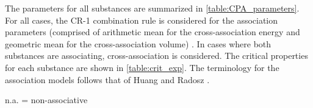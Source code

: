 \documentclass[preprint,12pt,3p]{elsarticle}
\begin{document}
	The parameters for all substances are summarized in \cref{table:CPA_parameters}. For all cases, the \mbox{CR-1} combination rule is considered for the association parameters (comprised of arithmetic mean for the cross-association energy and geometric mean for the cross-association volume)  . In cases where both substances are associating, cross-association is considered. The critical properties for each substance are shown in \cref{table:crit_exp}. The terminology for the association models follows that of Huang and Radosz \cite{huang1990equation}.

\begin{table}[h!]
\centering
\caption{Parameters of the CPA equation of state used in this work.}
\label{table:CPA_parameters}
\raggedright n.a. = non-associative
\end{table}
\end{document}
